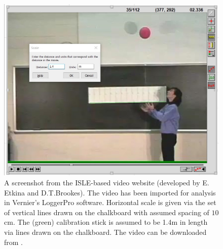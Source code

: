 \documentclass[12pt]{iopart}
\begin{document}
\begin{figure}[h]
\centering
\includegraphics[width=\columnwidth]{figure_1_Etkina-calibration.jpg}
\caption{ 
A screenshot from the ISLE-based video website (developed by E. Etkina and D.T.Brookes).
The video has been imported for analysis in Vernier's LoggerPro software.    
Horizontal  scale is given via the set of vertical lines drawn on the chalkboard with assumed spacing of $10$cm. 
The (green) calibration stick is assumed to be 1.4m in length via lines drawn on the chalkboard.  The video can be downloaded from \cite{ISLE_ball_video_source} .
}
\label{Etkina-calibration}
\end{figure}
\end{document}
